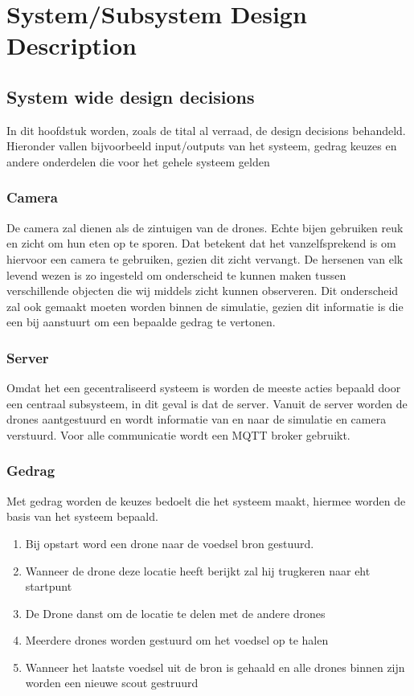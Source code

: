 \section{System/Subsystem Design Description}

\subsection{System wide design decisions}
In dit hoofdstuk worden, zoals de tital al verraad, de design decisions behandeld. Hieronder vallen bijvoorbeeld
input/outputs van het systeem, gedrag keuzes en andere onderdelen die voor het gehele systeem gelden


\subsubsection{Camera}
De camera zal dienen als de zintuigen van de drones. Echte bijen gebruiken reuk en zicht om hun eten op te sporen. Dat betekent dat het vanzelfsprekend is om hiervoor een camera te gebruiken, gezien dit zicht vervangt. De hersenen van elk levend wezen is zo ingesteld om onderscheid te kunnen maken tussen verschillende objecten die wij middels zicht kunnen observeren. Dit onderscheid zal ook gemaakt moeten worden binnen de simulatie, gezien dit informatie is die een bij aanstuurt om een bepaalde gedrag te vertonen.

\subsubsection{Server}
Omdat het een gecentraliseerd systeem is worden de meeste acties bepaald door een centraal subsysteem, in dit geval is dat de server.
Vanuit de server worden de drones aantgestuurd en wordt informatie van en naar de simulatie en camera verstuurd. Voor alle communicatie
wordt een MQTT broker gebruikt.

\subsubsection*{Gedrag}
Met gedrag worden de keuzes bedoelt die het systeem maakt, hiermee worden de basis van het systeem bepaald.
\begin{enumerate}
    \item Bij opstart word een drone naar de voedsel bron gestuurd.
    \item Wanneer de drone deze locatie heeft berijkt zal hij trugkeren naar eht startpunt
    \item De Drone danst om de locatie te delen met de andere drones
    \item Meerdere drones worden gestuurd om het voedsel op te halen
    \item Wanneer het laatste voedsel uit de bron is gehaald en alle drones binnen zijn worden een nieuwe scout gestruurd
\end{enumerate}

